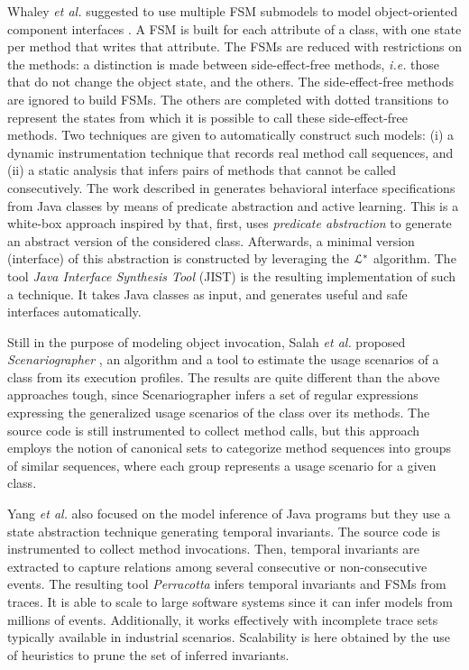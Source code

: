 Whaley \emph{et al.} suggested to use multiple FSM submodels to model
object-oriented component interfaces
\cite{Whaley:2002:AEO:566171.566212}. A FSM is built for each
attribute of a class, with one state per method that writes that
attribute. The FSMs are reduced with restrictions on the methods:
a distinction is made between side-effect-free methods, \emph{i.e.} those
that do not change the object state, and the others. The
side-effect-free methods are ignored to build FSMs. The others are
completed with dotted transitions to represent the states
from which it is possible to call these side-effect-free methods.
Two techniques are given to automatically construct such models:
(i) a dynamic instrumentation technique that records real method call
sequences, and (ii) a static analysis that infers pairs of
methods that cannot be called consecutively. The work described
in \cite{Alur:2005:SIS:1047659.1040314} generates behavioral
interface specifications from Java classes by means of predicate
abstraction and active learning. This is a white-box approach
inspired by \cite{Whaley:2002:AEO:566171.566212} that, first,
uses \textit{predicate abstraction} to generate an abstract
version of the considered class. Afterwards, a minimal version
(interface) of this abstraction is constructed by leveraging the
$\EuScript{L}^*$ algorithm. The tool \textit{Java Interface
Synthesis Tool} (JIST) is the resulting implementation of such a
technique. It takes Java classes as input, and generates useful
and safe interfaces automatically.

Still in the purpose of modeling object invocation, Salah \emph{et al.}
proposed \textit{Scenariographer} \cite{Salah05scenariographer},
an algorithm and a tool to estimate the usage scenarios of a
class from its execution profiles. The results are quite
different than the above approaches tough, since Scenariographer
infers a set of regular expressions expressing the generalized
usage scenarios of the class over its methods. The source code is
still instrumented to collect method calls, but this approach
employs the notion of canonical sets to categorize method
sequences into groups of similar sequences, where each group
represents a usage scenario for a given class.

Yang \emph{et al.} \cite{Yang:2006:PMT:1134285.1134325} also focused on
the model inference of Java programs but they use a state
abstraction technique generating temporal invariants. The source
code is instrumented to collect method invocations. Then,
temporal invariants are extracted to capture relations among
several consecutive or non-consecutive events. The resulting tool
\textit{Perracotta} infers temporal invariants and FSMs from
traces. It is able to scale to large software systems since it
can infer models from millions of events. Additionally, it works
effectively with incomplete trace sets typically available in
industrial scenarios. Scalability is here obtained by the use of
heuristics to prune the set of inferred invariants.

